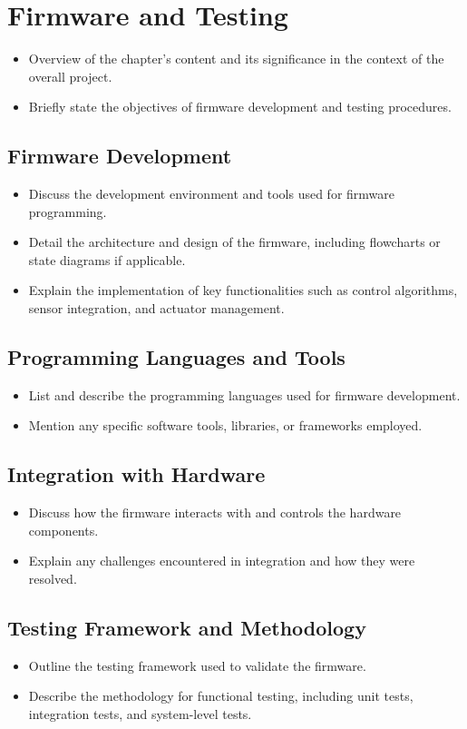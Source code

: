 \chapter{Firmware and Testing}

\graphicspath{{./Figures/Modeling}}

\begin{itemize}
	\item Overview of the chapter's content and its significance in the context of the overall project.
	\item Briefly state the objectives of firmware development and testing procedures.
\end{itemize}


\section{Firmware Development}
\begin{itemize}
	\item Discuss the development environment and tools used for firmware programming.
	\item Detail the architecture and design of the firmware, including flowcharts or state  diagrams if applicable.
	\item Explain the implementation of key functionalities such as control algorithms, sensor integration, and actuator management.
\end{itemize}
\section{Programming Languages and Tools}
\begin{itemize}
	\item List and describe the programming languages used for firmware development.
	\item Mention any specific software tools, libraries, or frameworks employed.
\end{itemize}
\section{Integration with Hardware}
\begin{itemize}
	\item Discuss how the firmware interacts with and controls the hardware components.
	\item Explain any challenges encountered in integration and how they were resolved.
\end{itemize}
\section{Testing Framework and Methodology}
\begin{itemize}
	\item Outline the testing framework used to validate the firmware.
	\item Describe the methodology for functional testing, including unit tests, integration tests, and system-level tests.
\end{itemize}
